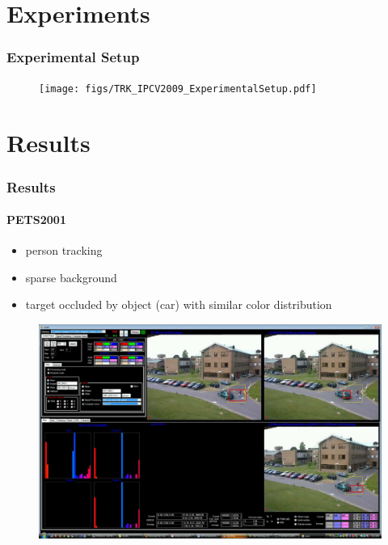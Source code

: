 \section{Experiments}

\begin{frame}
\frametitle{Experimental Setup}
\logoCSIPCPL\mypagenum 
	\begin{figure}
		\texttt{[image: figs/TRK\_IPCV2009\_ExperimentalSetup.pdf]}
	\end{figure}
\end{frame}



\section{Results}
\begin{frame}
\frametitle{Results}
\framesubtitle{PETS2001} 
\logoCSIPCPL\mypagenum
	\begin{itemize}
		\item person tracking
		\item sparse background
		\item target occluded by object (car) with similar color distribution
	\end{itemize}
	\begin{figure}
		\includegraphics[width=1.0\textwidth]{figs/ICIP2009_PETS2001_FN_00592_snapshotVVG.pdf}
	\end{figure}
\end{frame}



